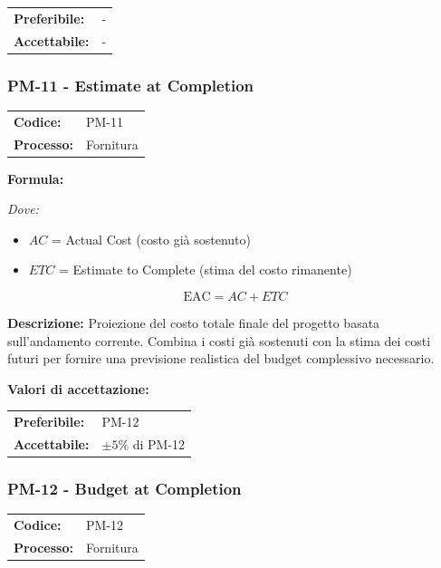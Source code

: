 \documentclass[a4paper,11pt,oneside]{scrartcl}
\begin{document}
\noindent
\begin{tabular}{@{}ll@{}}
\textbf{Preferibile:} & - \\
\textbf{Accettabile:} & - \\
\end{tabular}

\subsubsection{PM-11 - Estimate at Completion}

\noindent
\begin{tabular}{@{}p{}p{}@{}}
\textbf{Codice:} & PM-11 \\
\textbf{Processo:} & Fornitura \\
\end{tabular}

\vspace{0.3cm}
\noindent\textbf{Formula:}

\noindent\textit{Dove:}
\begin{itemize}[leftmargin=1.5cm, topsep=0pt, itemsep=0pt]
    \item $AC$ = Actual Cost (costo già sostenuto)
    \item $ETC$ = Estimate to Complete (stima del costo rimanente)
\end{itemize}

\[
\text{EAC} = AC + ETC
\]

\noindent\textbf{Descrizione:} Proiezione del costo totale finale del progetto basata sull'andamento corrente. Combina i costi già sostenuti con la stima dei costi futuri per fornire una previsione realistica del budget complessivo necessario.

\vspace{0.2cm}
\noindent\textbf{Valori di accettazione:}
\vspace{0.1cm}

\noindent
\begin{tabular}{@{}ll@{}}
\textbf{Preferibile:} & PM-12 \\
\textbf{Accettabile:} & $\pm 5\%$ di PM-12 \\
\end{tabular}

\subsubsection{PM-12 - Budget at Completion}

\noindent
\begin{tabular}{@{}p{}p{}@{}}
\textbf{Codice:} & PM-12 \\
\textbf{Processo:} & Fornitura \\
\end{tabular}
\end{document}

